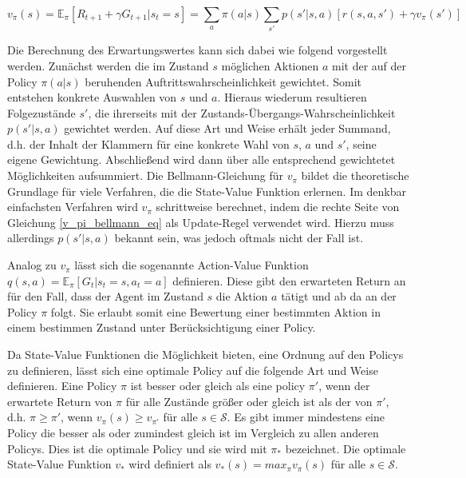 \begin{equation}
  v_\pi(s) = \mathbb{E}_\pi[R_{t+1} + \gamma G_{t+1} | s_t=s] = \sum_{a} \pi(a|s) \sum_{s'} p(s'|s,a) [r(s,a,s') + \gamma v_\pi(s')]
  \label{v_pi_bellmann_eq}
\end{equation}

Die Berechnung des Erwartungswertes kann sich dabei wie folgend vorgestellt werden. Zunächst werden die im Zustand $s$ möglichen Aktionen $a$ mit der auf der Policy $\pi(a|s)$ beruhenden Auftrittswahrscheinlichkeit gewichtet. Somit entstehen konkrete Auswahlen von $s$ und $a$. Hieraus wiederum resultieren Folgezustände $s'$, die ihrerseits mit der Zustands-Übergangs-Wahrscheinlichkeit $p(s'|s,a)$ gewichtet werden. Auf diese Art und Weise erhält jeder Summand, d.h. der Inhalt der Klammern für eine konkrete Wahl von $s$, $a$ und $s'$, seine eigene Gewichtung. Abschließend wird dann über alle entsprechend gewichtetet Möglichkeiten aufsummiert. Die Bellmann-Gleichung für $v_\pi$ bildet die theoretische Grundlage für viele Verfahren, die die State-Value Funktion erlernen. Im denkbar einfachsten Verfahren wird $v_\pi$ schrittweise berechnet, indem die rechte Seite von Gleichung \eqref{v_pi_bellmann_eq} als Update-Regel verwendet wird. Hierzu muss allerdings $p(s'|s,a)$ bekannt sein, was jedoch oftmals nicht der Fall ist.

Analog zu $v_\pi$ lässt sich die sogenannte Action-Value Funktion $q(s,a) = \mathbb{E}_\pi[G_t | s_t=s, a_t=a]$ definieren. Diese gibt den erwarteten Return an für den Fall, dass der Agent im Zustand $s$ die Aktion $a$ tätigt und ab da an der Policy $\pi$ folgt. Sie erlaubt somit eine Bewertung einer bestimmten Aktion in einem bestimmen Zustand unter Berücksichtigung einer Policy.

Da State-Value Funktionen die Möglichkeit bieten, eine Ordnung auf den Policys zu definieren, lässt sich eine optimale Policy auf die folgende Art und Weise definieren. Eine Policy $\pi$ ist besser oder gleich als eine policy $\pi'$, wenn der erwartete Return von $\pi$ für alle Zustände größer oder gleich ist als der von $\pi'$, d.h. $\pi \ge \pi'$, wenn $v_\pi(s) \ge v_{\pi'}$ für alle $s \in \mathcal{S}$. Es gibt immer mindestens eine Policy die besser als oder zumindest gleich ist im Vergleich zu allen anderen Policys. Dies ist die optimale Policy und sie wird mit $\pi_*$ bezeichnet. Die optimale State-Value Funktion $v_*$ wird definiert als $v_*(s) = max_\pi v_\pi(s)$ für alle $s \in \mathcal{S}$.

